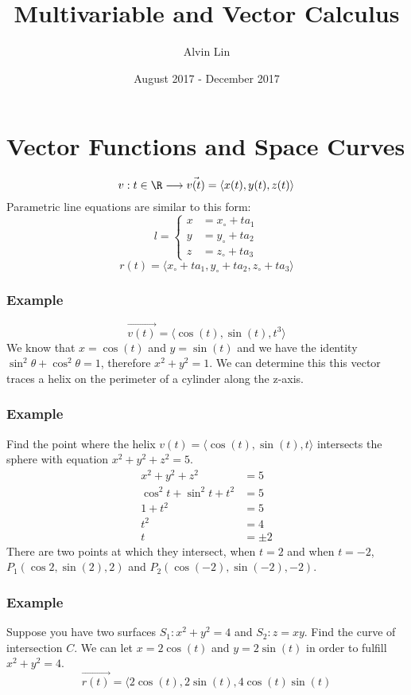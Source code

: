 \documentclass[letterpaper, 12pt]{math}
\title{Multivariable and Vector Calculus}
\author{Alvin Lin}
\date{August 2017 - December 2017}
\begin{document}
\maketitle

\section*{Vector Functions and Space Curves}
\[ v:t\in\R \longrightarrow \vec{v(t)} = \langle x(t),y(t),z(t)\rangle \]
Parametric line equations are similar to this form:
\[ l = \begin{cases}
  x &= x_{\circ}+ta_1 \\
  y &= y_{\circ}+ta_2 \\
  z &= z_{\circ}+ta_3
\end{cases} \]
\[ r(t) = \langle x_{\circ}+ta_1,y_{\circ}+ta_2,z_{\circ}+ta_3\rangle \]

\subsubsection*{Example}
\[ \vec{v(t)} = \langle\cos(t),\sin(t),t^3\rangle \]
We know that \( x = \cos(t) \) and \( y = \sin(t) \) and we have the identity
\( \sin^2\theta+\cos^2\theta = 1 \), therefore \( x^2+y^2 = 1 \). We can
determine this this vector traces a helix on the perimeter of a cylinder along
the z-axis.

\subsubsection*{Example}
Find the point where the helix \( v(t) = \langle\cos(t),\sin(t),t\rangle \)
intersects the sphere with equation \( x^2+y^2+z^2 = 5 \).
\begin{align*}
  x^2+y^2+z^2 &= 5 \\
  \cos^2t+\sin^2t+t^2 &= 5 \\
  1+t^2 &= 5 \\
  t^2 &= 4 \\
  t &= \pm2
\end{align*}
There are two points at which they intersect, when \( t = 2 \) and when
\( t = -2 \), \( P_1(\cos2,\sin(2),2) \) and \( P_2(\cos(-2),\sin(-2),-2) \).

\subsubsection*{Example}
Suppose you have two surfaces \( S_1:x^2+y^2 = 4 \) and \( S_2:z=xy \). Find
the curve of intersection \( C \). We can let \( x = 2\cos(t) \) and
\( y = 2\sin(t) \) in order to fulfill \( x^2+y^2 = 4 \).
\[ \vec{r(t)} = \langle2\cos(t),2\sin(t),4\cos(t)\sin(t) \]
\end{document}

